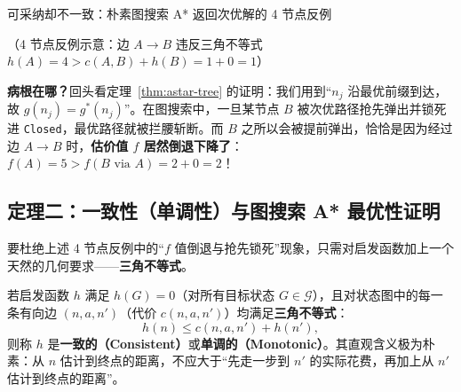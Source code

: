 \begin{failBox}{可采纳却不一致：朴素图搜索 A* 返回次优解的 4 节点反例}
\begin{center}
\par\smallskip
{\footnotesize\sffamily\color{slate}（4 节点反例示意：边 $A\to B$ 违反三角不等式 $h(A)=4 > c(A,B)+h(B)=1+0=1$）}
\end{center}
\textbf{病根在哪？}回头看定理~\ref{thm:astar-tree} 的证明：我们用到“$n_j$ 沿最优前缀到达，故 $g(n_j)=g^*(n_j)$”。在图搜索中，一旦某节点 $B$ 被次优路径抢先弹出并锁死进 \texttt{Closed}，最优路径就被拦腰斩断。而 $B$ 之所以会被提前弹出，恰恰是因为经过边 $A\to B$ 时，\textbf{估价值 $f$ 居然倒退下降了}：$f(A)=5 > f(B\text{ via }A)=2+0=2$！
\end{failBox}

\subsection{定理二：一致性（单调性）与图搜索 A* 最优性证明}

要杜绝上述 4 节点反例中的“$f$ 值倒退与抢先锁死”现象，只需对启发函数加上一个天然的几何要求——\textbf{三角不等式}。

\begin{defBox}
\begin{definition}\label{def:consistent}
若启发函数 $h$ 满足 $h(G)=0$（对所有目标状态 $G\in\mathcal{G}$），且对状态图中的每一条有向边 $(n, a, n')$（代价 $c(n,a,n')$）均满足\textbf{三角不等式}：
\begin{equation}\label{eq:consistency}
  h(n) \le c(n, a, n') + h(n'),
\end{equation}
则称 $h$ 是\textbf{一致的（Consistent）}或\textbf{单调的（Monotonic）}。其直观含义极为朴素：从 $n$ 估计到终点的距离，不应大于“先走一步到 $n'$ 的实际花费，再加上从 $n'$ 估计到终点的距离”。
\end{definition}
\end{defBox}

